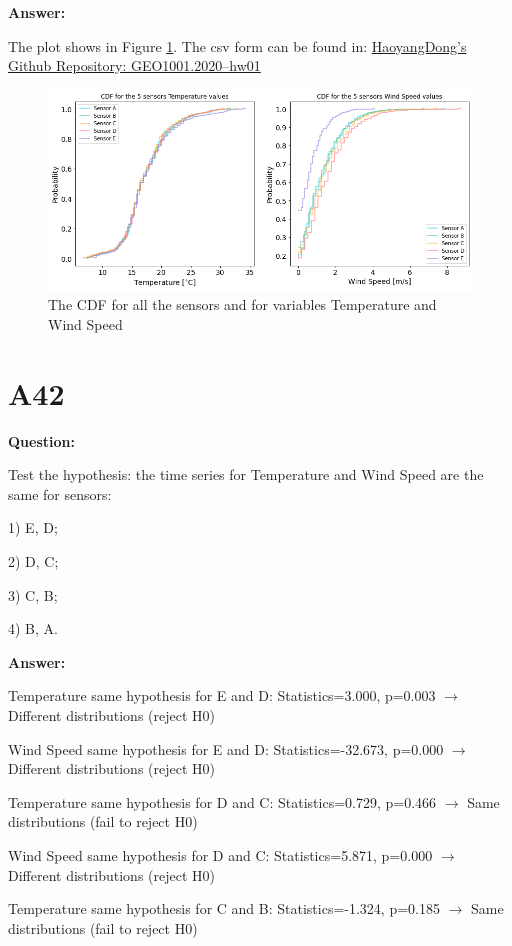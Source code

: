 \documentclass[a4paper]{article}
\numberwithin{figure}{section}
\numberwithin{table}{section}
\begin{document}
\textbf{Answer:}

The plot shows in Figure \ref{Fig:A41}. The csv form can be found in: \href{https://github.com/HaoyangDong/GEO1001.2020--hw01}{HaoyangDong's Github Repository: GEO1001.2020--hw01} 

\begin{figure}
\centering
\includegraphics[scale=0.45]{Figures/figA41.png}
\caption{The CDF for all the sensors and for variables Temperature and Wind Speed}
\label{Fig:A41}
\end{figure}


\section{A42}

\textbf{Question:}

Test the hypothesis: the time series for Temperature and Wind Speed are the same for sensors:

1) E, D;

2) D, C;

3) C, B;

4) B, A.

\textbf{Answer:}

Temperature same hypothesis for E and D: Statistics=3.000, p=0.003 $\rightarrow$ Different distributions (reject H0)

Wind Speed same hypothesis for E and D: Statistics=-32.673, p=0.000 $\rightarrow$ Different distributions (reject H0)


Temperature same hypothesis for D and C: Statistics=0.729, p=0.466 $\rightarrow$ Same distributions (fail to reject H0)

Wind Speed same hypothesis for D and C: Statistics=5.871, p=0.000 $\rightarrow$ Different distributions (reject H0)


Temperature same hypothesis for C and B: Statistics=-1.324, p=0.185 $\rightarrow$ Same distributions (fail to reject H0)
\end{document}
